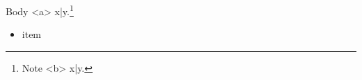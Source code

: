\documentclass{article}
\begin{document}
Body <a> x|y.\footnote{Note <b> x|y.}
\begin{itemize}\item[<i>] item\end{itemize}
\end{document}
